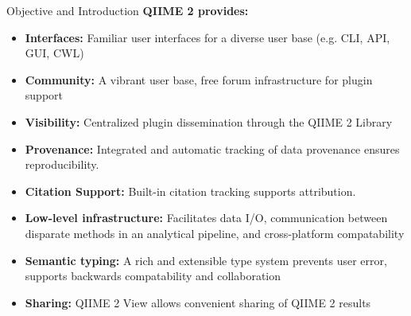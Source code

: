 \documentclass[final]{beamer}
\newlength{\colwidth}
\begin{document}
\begin{frame}[t]
\begin{columns}[t]
\begin{column}{\colwidth}
\begin{block}{Objective and Introduction}
    \textbf{QIIME 2 provides:}
    \begin{itemize}
      \item \textbf{Interfaces:} Familiar user interfaces for a diverse
      user base (e.g. CLI, API, GUI, CWL)
      \item \textbf{Community:} A vibrant user base, free forum infrastructure for
      plugin support
      \item \textbf{Visibility:} Centralized plugin dissemination through the QIIME 2
      Library
      \item \textbf{Provenance:} Integrated and automatic tracking of data provenance
      ensures reproducibility.
      \item \textbf{Citation Support:} Built-in citation tracking supports attribution.
      \item \textbf{Low-level infrastructure:} Facilitates data I/O, communication
      between disparate methods in an analytical pipeline, and cross-platform compatability
      \item \textbf{Semantic typing:} A rich and extensible type system prevents user
      error, supports backwards compatability and collaboration
      \item \textbf{Sharing:} QIIME 2 View allows convenient sharing of QIIME 2 results
    \end{itemize}
  \end{block}



\end{column}
\end{columns}
\end{frame}
\end{document}
